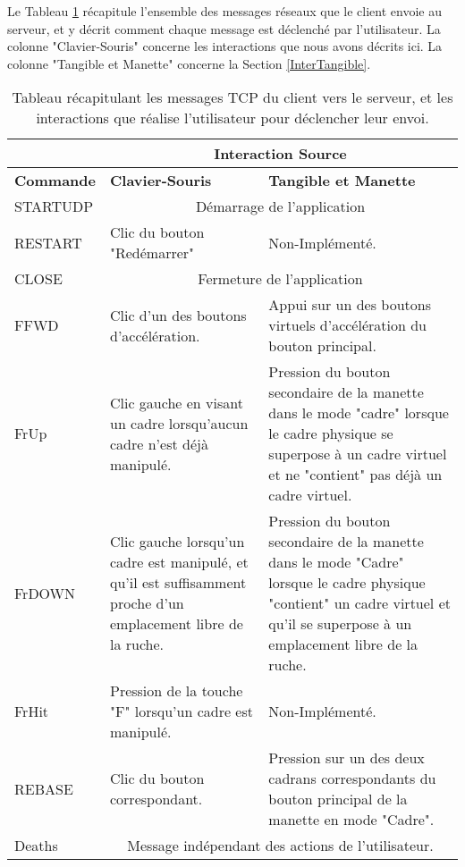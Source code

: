 		 Le Tableau \ref{tabTotalInterClient} récapitule l'ensemble des messages réseaux que le client envoie au serveur, et y décrit comment chaque message est déclenché par l'utilisateur. La colonne "Clavier-Souris" concerne les interactions que nous avons décrits ici. La colonne "Tangible et Manette" concerne la Section \ref{InterTangible}.
	
	\begin{table}
		\begin{tabularx}{\textwidth}{|l|p{4.5cm}|X|}
		\hline
		 & \multicolumn{2}{c|}{\textbf{Interaction Source}}\\
		 \hline
		 \textbf{Commande} & \textbf{Clavier-Souris} & \textbf{Tangible et Manette}\\
		 \hline
		 STARTUDP & \multicolumn{2}{c|}{Démarrage de l'application}\\
		 \hline
		 RESTART & Clic du bouton "Redémarrer" & Non-Implémenté.\\
		 \hline
		 CLOSE & \multicolumn{2}{c|}{Fermeture de l'application}\\
		 \hline
		 FFWD & Clic d'un des boutons d'accélération. & Appui sur un des boutons virtuels d'accélération du bouton principal.\\
		 \hline
		 FrUp & Clic gauche en visant un cadre lorsqu'aucun cadre n'est déjà manipulé. & Pression du bouton secondaire de la manette dans le mode "cadre" lorsque le cadre physique se superpose à un cadre virtuel et ne "contient" pas déjà un cadre virtuel.\\
		 \hline
		 FrDOWN & Clic gauche lorsqu'un cadre est manipulé, et qu'il est suffisamment proche d'un emplacement libre de la ruche. & Pression du bouton secondaire de la manette dans le mode "Cadre" lorsque le cadre physique "contient" un cadre virtuel et qu'il se superpose à un emplacement libre de la ruche.\\
		 \hline
		 FrHit & Pression de la touche "F" lorsqu'un cadre est manipulé. & Non-Implémenté.\\
		 \hline
		 REBASE & Clic du bouton correspondant. & Pression sur un des deux cadrans correspondants du bouton principal de la manette en mode "Cadre".\\
		 \hline
		 Deaths & \multicolumn{2}{c|}{Message indépendant des actions de l'utilisateur.}\\
		 \hline 
		\end{tabularx}
	\caption{Tableau récapitulant les messages TCP du client vers le serveur, et les interactions que réalise l'utilisateur pour déclencher leur envoi.}
	\label{tabTotalInterClient}
	\end{table}
		
